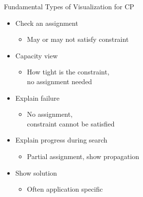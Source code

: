 \documentclass[dvipsnames,aspectratio=169]{beamer}
\begin{document}
\begin{frame}{Fundamental Types of Visualization for CP}

\begin{itemize}
    \item<+-|alert@+> Check an assignment 
    \begin{itemize}
        \item May or may not satisfy constraint
    \end{itemize}
    \item<+-|alert@+> Capacity view 
    \begin{itemize}
        \item How tight is the constraint, \\no assignment needed
    \end{itemize}
    \item<+-|alert@+> Explain failure 
    \begin{itemize}
        \item No assignment, \\constraint cannot be satisfied
    \end{itemize}
    \item<+-|alert@+> Explain progress during search 
    \begin{itemize}
        \item Partial assignment, show propagation
    \end{itemize}
    \item<+-|alert@+> Show solution 
    \begin{itemize}
        \item Often application specific
    \end{itemize}
\end{itemize}    
\end{frame}
\end{document}
